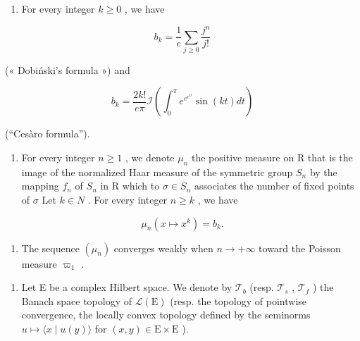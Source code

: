\begin{enumerate}
\def\labelenumi{\alph{enumi})}
\setcounter{enumi}{3}
\tightlist
\item
  For every integer \(k \geqslant 0\) , we have
\end{enumerate}

\[
b _ {k} = \frac {1}{e} \sum_ {j \geqslant 0} \frac {j ^ {n}}{j !}
\]

(« Dobiński's formula ») and

\[
b _ {k} = \frac {2 k !}{e \pi} \mathcal {I} \left(\int_ {0} ^ {\pi} e ^ {e ^ {e ^ {i t}}} \sin (k t) d t\right)
\]

(“Cesàro formula”).

\begin{enumerate}
\def\labelenumi{\alph{enumi})}
\setcounter{enumi}{4}
\tightlist
\item
  For every integer \(n \geqslant 1\) , we denote \(\mu_{n}\) the positive measure on R that is the image of the normalized Haar measure of the symmetric group \(S_{n}\) by the mapping \(f_{n}\) of \(S_{n}\) in R which to \(\sigma \in S_{n}\) associates the number of fixed points of \(\sigma\) Let \(k \in N\) . For every integer \(n \geqslant k\) , we have
\end{enumerate}

\[
\mu_ {n} (x \mapsto x ^ {k}) = b _ {k}.
\]

\begin{enumerate}
\def\labelenumi{\alph{enumi})}
\setcounter{enumi}{5}
\tightlist
\item
  The sequence \((\mu_{n})\) converges weakly when \(n \to +\infty\) toward the Poisson measure \(\varpi_{1}\) .
\end{enumerate}

\begin{enumerate}
\def\labelenumi{\arabic{enumi})}
\setcounter{enumi}{28}
\tightlist
\item
  Let E be a complex Hilbert space. We denote by \(\mathcal{T}_b\) (resp. \(\mathcal{T}_s\) , \(\mathcal{T}_f\) ) the Banach space topology of \(\mathcal{L}(\mathrm{E})\) (resp. the topology of pointwise convergence, the locally convex topology defined by the seminorms \(u \mapsto \langle x \mid u(y) \rangle\) for \((x, y) \in \mathrm{E} \times \mathrm{E}\) ).
\end{enumerate}

